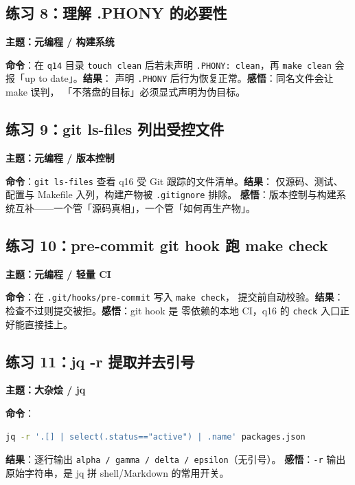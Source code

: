 \documentclass{hamesome-report}
\begin{document}
\subsection{练习 8：理解 .PHONY 的必要性}
\textbf{主题：元编程 / 构建系统}\par
\textbf{命令}：在 \texttt{q14} 目录 \texttt{touch clean} 后若未声明
\texttt{.PHONY: clean}，再 \texttt{make\ clean} 会报「up to date」。\textbf{结果}：
声明 \texttt{.PHONY} 后行为恢复正常。\textbf{感悟}：同名文件会让 make 误判，
「不落盘的目标」必须显式声明为伪目标。

\subsection{练习 9：git ls-files 列出受控文件}
\textbf{主题：元编程 / 版本控制}\par
\textbf{命令}：\texttt{git ls-files} 查看 q16 受 Git 跟踪的文件清单。\textbf{结果}：
仅源码、测试、配置与 Makefile 入列，构建产物被 \texttt{.gitignore} 排除。
\textbf{感悟}：版本控制与构建系统互补——一个管「源码真相」，一个管「如何再生产物」。

\subsection{练习 10：pre-commit git hook 跑 make check}
\textbf{主题：元编程 / 轻量 CI}\par
\textbf{命令}：在 \texttt{.git/hooks/pre-commit} 写入 \texttt{make\ check}，
提交前自动校验。\textbf{结果}：检查不过则提交被拒。\textbf{感悟}：git hook 是
零依赖的本地 CI，q16 的 \texttt{check} 入口正好能直接挂上。

\subsection{练习 11：jq -r 提取并去引号}
\textbf{主题：大杂烩 / jq}\par
\textbf{命令}：
\begin{lstlisting}[language=bash]
jq -r '.[] | select(.status=="active") | .name' packages.json
\end{lstlisting}
\textbf{结果}：逐行输出 \texttt{alpha / gamma / delta / epsilon}（无引号）。
\textbf{感悟}：\texttt{-r} 输出原始字符串，是 jq 拼 shell/Markdown 的常用开关。

\end{document}
